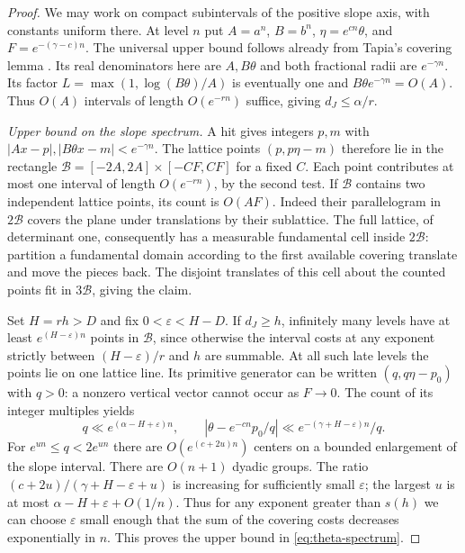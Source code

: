 \documentclass[11pt,reqno,a4paper]{amsart}
\theoremstyle{remark}
\numberwithin{equation}{section}
\begin{document}
\begin{proof}
We may work on compact subintervals of the positive slope axis, with
constants uniform there. At level \(n\) put \(A=a^n\), \(B=b^n\),
\(\eta=e^{cn}\theta\), and \(F=e^{-(\gamma-c)n}\).
The universal upper bound follows already from Tapia's covering lemma
\cite[\S3.1.1, Lemma~2]{Tapia}. Its real denominators here are \(A,B\theta\)
and both fractional radii are \(e^{-\gamma n}\). Its factor
\(L=\max(1,\log(B\theta)/A)\) is eventually one and
\(B\theta e^{-\gamma n}=O(A)\). Thus \(O(A)\) intervals of length
\(O(e^{-rn})\) suffice, giving \(d_J\le\alpha/r\).

\emph{Upper bound on the slope spectrum.}
A hit gives integers \(p,m\) with
\(\lvert Ax-p\rvert,\lvert B\theta x-m\rvert<e^{-\gamma n}\).
The lattice points \((p,p\eta-m)\) therefore lie in the rectangle
\(\mathcal B=[-2A,2A]\times[-CF,CF]\) for a fixed \(C\). Each point
contributes at most one interval of length \(O(e^{-rn})\), by the
second test. If \(\mathcal B\) contains two independent lattice
points, its count is \(O(AF)\). Indeed their parallelogram in
\(2\mathcal B\) covers the plane under translations by their
sublattice. The full lattice, of determinant one, consequently has
a measurable fundamental cell inside \(2\mathcal B\): partition a
fundamental domain according to the first available covering
translate and move the pieces back. The disjoint translates of this
cell about the counted points fit in \(3\mathcal B\), giving the claim.

Set \(H=rh>D\) and fix \(0<\varepsilon<H-D\). If \(d_J\ge h\),
infinitely many levels have at least \(e^{(H-\varepsilon)n}\) points
in \(\mathcal B\), since otherwise the interval costs at any exponent
strictly between \((H-\varepsilon)/r\) and \(h\) are summable.
At all such late levels the points lie on one lattice line.
Its primitive generator can be written \((q,q\eta-p_0)\) with \(q>0\):
a nonzero vertical vector cannot occur as \(F\to0\). The count of its
integer multiples yields
\[
 q\ll e^{(\alpha-H+\varepsilon)n},\qquad
 |\theta-e^{-cn}p_0/q|\ll e^{-(\gamma+H-\varepsilon)n}/q .
\]
For \(e^{un}\le q<2e^{un}\) there are \(O(e^{(c+2u)n})\) centers on a
bounded enlargement of the slope interval. There are \(O(n+1)\) dyadic
groups. The ratio \((c+2u)/(\gamma+H-\varepsilon+u)\) is increasing
for sufficiently small \(\varepsilon\); the largest \(u\) is at most
\(\alpha-H+\varepsilon+O(1/n)\). Thus for any exponent greater than
\(s(h)\) we can choose \(\varepsilon\) small enough that the sum of
the covering costs decreases exponentially in \(n\). This proves the
upper bound in \eqref{eq:theta-spectrum}.


\end{proof}
\end{document}
